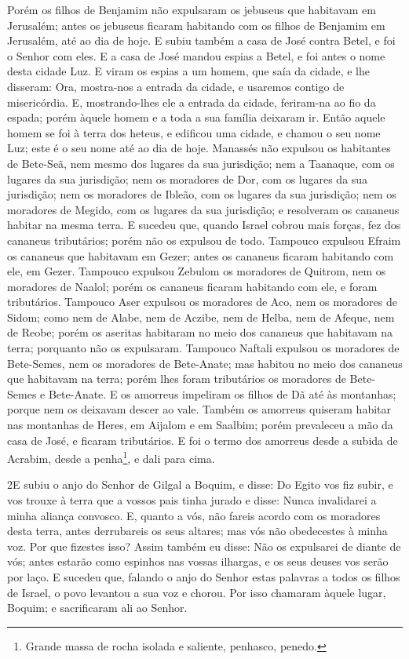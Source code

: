 Porém os filhos de Benjamim não expulsaram os jebuseus que
habitavam em Jerusalém; antes os jebuseus ficaram habitando com os
filhos de Benjamim em Jerusalém, até ao dia de hoje. E subiu
também a casa de José contra Betel, e foi o Senhor com eles.
E a casa de José mandou espias a Betel, e foi antes o nome
desta cidade Luz. E viram os espias a um homem, que saía da
cidade, e lhe disseram: Ora, mostra-nos a entrada da cidade, e
usaremos contigo de misericórdia. E, mostrando-lhes ele a
entrada da cidade, feriram-na ao fio da espada; porém àquele homem e
a toda a sua família deixaram ir. Então aquele homem se foi à
terra dos heteus, e edificou uma cidade, e chamou o seu nome Luz;
este é o seu nome até ao dia de hoje. Manassés não expulsou
os habitantes de Bete-Seã, nem mesmo dos lugares da sua jurisdição;
nem a Taanaque, com os lugares da sua jurisdição; nem os moradores
de Dor, com os lugares da sua jurisdição; nem os moradores de
Ibleão, com os lugares da sua jurisdição; nem os moradores de
Megido, com os lugares da sua jurisdição; e resolveram os cananeus
habitar na mesma terra. E sucedeu que, quando Israel cobrou
mais forças, fez dos cananeus tributários; porém não os expulsou de
todo. Tampouco expulsou Efraim os cananeus que habitavam em
Gezer; antes os cananeus ficaram habitando com ele, em Gezer.
Tampouco expulsou Zebulom os moradores de Quitrom, nem os
moradores de Naalol; porém os cananeus ficaram habitando com ele, e
foram tributários. Tampouco Aser expulsou os moradores de
Aco, nem os moradores de Sidom; como nem de Alabe, nem de Aczibe,
nem de Helba, nem de Afeque, nem de Reobe; porém os aseritas
habitaram no meio dos cananeus que habitavam na terra; porquanto não
os expulsaram. Tampouco Naftali expulsou os moradores de
Bete-Semes, nem os moradores de Bete-Anate; mas habitou no meio dos
cananeus que habitavam na terra; porém lhes foram tributários os
moradores de Bete-Semes e Bete-Anate. E os amorreus impeliram
os filhos de Dã até às montanhas; porque nem os deixavam descer ao
vale. Também os amorreus quiseram habitar nas montanhas de
Heres, em Aijalom e em Saalbim; porém prevaleceu a mão da casa de
José, e ficaram tributários. E foi o termo dos amorreus desde
a subida de Acrabim, desde a penha\footnote{Grande massa de rocha
isolada e saliente, penhasco, penedo.}, e dali para cima.

\medskip

\lettrine{2} E subiu o anjo do Senhor de Gilgal a Boquim, e
disse: Do Egito vos fiz subir, e vos trouxe à terra que a vossos
pais tinha jurado e disse: Nunca invalidarei a minha aliança
convosco. E, quanto a vós, não fareis acordo com os moradores
desta terra, antes derrubareis os seus altares; mas vós não
obedecestes à minha voz. Por que fizestes isso? Assim também eu
disse: Não os expulsarei de diante de vós; antes estarão como
espinhos nas vossas ilhargas, e os seus deuses vos serão por laço.
E sucedeu que, falando o anjo do Senhor estas palavras a todos
os filhos de Israel, o povo levantou a sua voz e chorou. Por
isso chamaram àquele lugar, Boquim; e sacrificaram ali ao Senhor.

